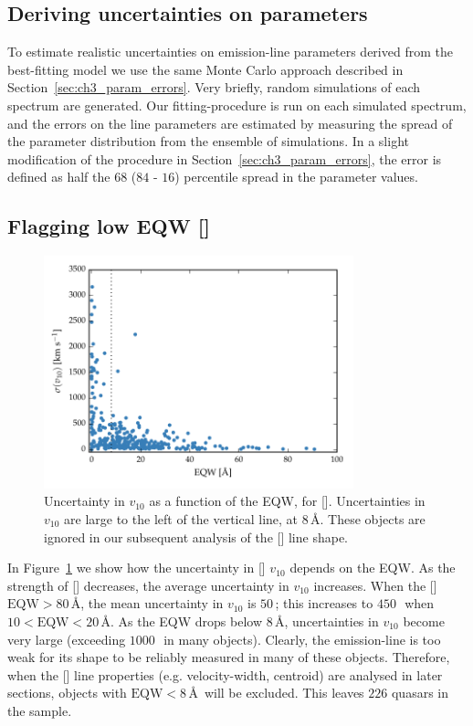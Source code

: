 \subsection{Deriving uncertainties on parameters}

To estimate realistic uncertainties on emission-line parameters derived from the best-fitting model we use the same Monte Carlo approach described in Section~\ref{sec:ch3_param_errors}. 
Very briefly, random simulations of each spectrum are generated.
Our fitting-procedure is run on each simulated spectrum, and the errors on the line parameters are estimated by measuring the spread of the parameter distribution from the ensemble of simulations. 
In a slight modification of the procedure in Section~\ref{sec:ch3_param_errors}, the error is defined as half the $68$ ($84$ - $16$) percentile spread in the parameter values. 

\subsection{Flagging low EQW []}
\label{sec:ch4-loweqw}

\begin{figure}
    \centering
    \includegraphics[width=0.8\textwidth]{figures/chapter04/eqw_cut.pdf} 
    \caption[{Uncertainty in $v_{10}$ as a function of the EQW, for [].}]{Uncertainty in $v_{10}$ as a function of the EQW, for []. Uncertainties in $v_{10}$ are large to the left of the vertical line, at $8$\,\AA. These objects are ignored in our subsequent analysis of the [] line shape.}     
    \label{fig:eqw_cut}
\end{figure}

In Figure~\ref{fig:eqw_cut} we show how the uncertainty in [] $v_{10}$ depends on the EQW. 
As the strength of [] decreases, the average uncertainty in $v_{10}$ increases.
When the [] $\text{EQW} > 80$\,\AA, the mean uncertainty in $v_{10}$ is $50$\,\kms; this increases to $450$\,\kms\, when $10 < \text{EQW} < 20$\,\AA. 
As the EQW drops below $8$\,\AA, uncertainties in $v_{10}$ become very large (exceeding $1000$\,\kms\, in many objects). 
Clearly, the emission-line is too weak for its shape to be reliably measured in many of these objects. 
Therefore, when the [] line properties (e.g. velocity-width, centroid) are analysed in later sections, objects with $\text{EQW} < 8$\,\AA\, will be excluded. 
This leaves $226$ quasars in the sample. 

